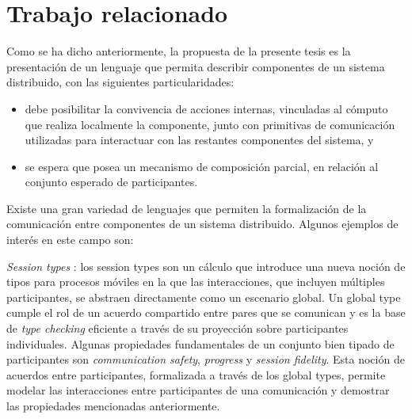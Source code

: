 \section{Trabajo relacionado}
\label{trabajo-relacionado}
Como se ha dicho anteriormente, la propuesta de la presente tesis es la presentación de un lenguaje que permita describir componentes de un sistema distribuido, con las siguientes particularidades: 
\begin{itemize}
\item debe posibilitar la convivencia de acciones internas, vinculadas al cómputo que realiza localmente la componente, junto con primitivas de comunicación utilizadas para interactuar con las restantes componentes del sistema, y
\item se espera que posea un mecanismo de composición parcial, en relación al conjunto esperado de participantes.
\end{itemize}

Existe una gran variedad de lenguajes que permiten la formalización de la comunicación entre componentes de un sistema distribuido. Algunos ejemplos de interés en este campo son:


\emph{Session types} \cite{honda:esop98,honda:popl08}: los session types son un cálculo que introduce una nueva noción de tipos para procesos móviles en la que las interacciones, que incluyen múltiples participantes, se abstraen directamente como un escenario global. Un global type cumple el rol de un acuerdo compartido entre pares que se comunican y es la base de \emph{type checking} eficiente a través de su proyección sobre participantes individuales. Algunas propiedades fundamentales de un conjunto bien tipado de participantes son \emph{communication safety}, \emph{progress} y \emph{session fidelity}. Esta noción de acuerdos entre participantes, formalizada a través de los global types, permite modelar las interacciones entre participantes de una comunicación y demostrar las propiedades mencionadas anteriormente.\\

